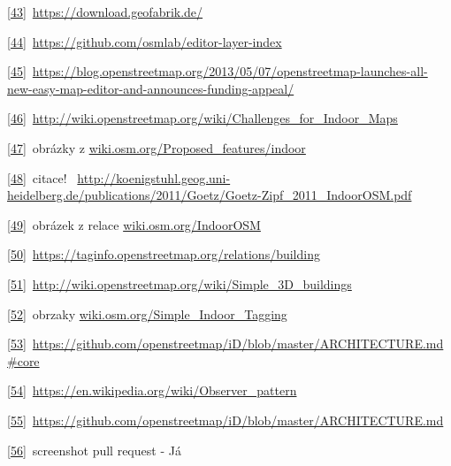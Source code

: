 \href{}{{[}43{]}}~\href{}{https://download.geofabrik.de/}~

\href{}{{[}44{]}}~\href{}{https://github.com/osmlab/editor-layer-index}~

\href{}{{[}45{]}}~\href{}{https://blog.openstreetmap.org/2013/05/07/openstreetmap-launches-all-new-easy-map-editor-and-announces-funding-appeal/}~

\href{}{{[}46{]}}~\href{}{http://wiki.openstreetmap.org/wiki/Challenges\_for\_Indoor\_Maps}~

\href{}{{[}47{]}}~obrázky z \href{}{wiki.osm.org/Proposed\_features/indoor}

\href{}{{[}48{]}}~citace! ~\href{}{http://koenigstuhl.geog.uni-heidelberg.de/publications/2011/Goetz/Goetz-Zipf\_2011\_IndoorOSM.pdf}~

\href{}{{[}49{]}}~obrázek z relace \href{}{wiki.osm.org/IndoorOSM}

\href{}{{[}50{]}}~\href{}{https://taginfo.openstreetmap.org/relations/building}~

\href{}{{[}51{]}}~\href{}{http://wiki.openstreetmap.org/wiki/Simple\_3D\_buildings}~

\href{}{{[}52{]}}~obrzaky \href{}{wiki.osm.org/Simple\_Indoor\_Tagging}

\href{}{{[}53{]}}~\href{}{https://github.com/openstreetmap/iD/blob/master/ARCHITECTURE.md\#core}~

\href{}{{[}54{]}}~\href{}{https://en.wikipedia.org/wiki/Observer\_pattern}~

\href{}{{[}55{]}}~\href{}{https://github.com/openstreetmap/iD/blob/master/ARCHITECTURE.md}~

\href{}{{[}56{]}}~screenshot pull request - Já
